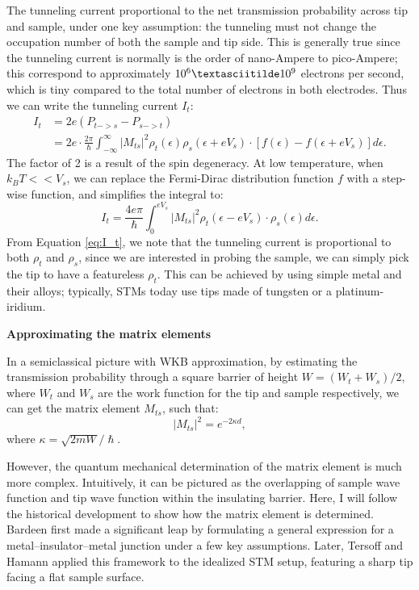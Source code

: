 The tunneling current proportional to the net transmission probability across tip and sample, under one key assumption: the tunneling must not change the occupation number of both the sample and tip side. This is generally true since the tunneling current is normally is the order of nano-Ampere to pico-Ampere; this correspond to approximately $10^6 \textasciitilde 10^9$ electrons per second, which is tiny compared to the total number of electrons in both electrodes. Thus we can write the tunneling current $I_t$:
\begin{align}
	I_t & = 2e(P_{t->s}-P_{s->t})\\
	& = 2e \cdot \frac{2\pi}{\hslash}\int_{-\infty}^{\infty}|M_{ts}|^2\rho_t(\epsilon) \rho_s(\epsilon + eV_s) \cdot[f(\epsilon) - f(\epsilon + eV_s)] d\epsilon.
\end{align}
The factor of 2 is a result of the spin degeneracy. At low temperature, when $k_BT<<V_s$, we can replace the Fermi-Dirac distribution function $f$ with a step-wise function, and simplifies the integral to: 
\begin{equation}
	\label{eq:I_t}
	I_t = \frac{4e\pi}{\hslash}\int_{0}^{eV_s}|M_{ts}|^2\rho_t(\epsilon - eV_s) \cdot \rho_s(\epsilon)d\epsilon. 
\end{equation} 
From Equation \ref{eq:I_t}, we note that the tunneling current is proportional to both $\rho_t$ and $\rho_s$, since we are interested in probing the sample, we can simply pick the tip to have a featureless $\rho_t$. This can be achieved by using simple metal and their alloys; typically, \ac{STM}s today use tips made of tungsten or a platinum-iridium.


\vspace{1em}
\noindent\textbf{Approximating the matrix elements}

\noindent In a semiclassical picture with WKB approximation, by estimating the transmission probability through a square barrier of height $W = (W_t + W_s)/2$, where $W_t$ and $W_s$ are the work function for the tip and sample respectively, we can get the matrix element $M_{ts}$, such that: 
\begin{equation}
	|M_{ts}|^2 = e^{-2\kappa d},
\end{equation}
where $\kappa = \sqrt{2mW}/\hslash$.

However, the quantum mechanical determination of the matrix element is much more complex. Intuitively, it can be pictured as the overlapping of sample wave function and tip wave function within the insulating barrier. Here, I will follow the historical development to show how the matrix element is determined. Bardeen first made a significant leap by formulating a general expression for a metal–insulator–metal junction under a few key assumptions. Later, Tersoff and Hamann applied this framework to the idealized STM setup, featuring a sharp tip facing a flat sample surface.

